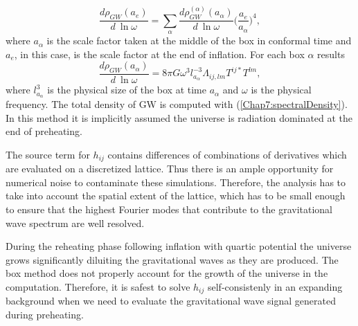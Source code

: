 \documentclass[11pt,a4paper,twoside]{book}
\begin{document}
\begin{equation}
\label{Chap7:SumUpEnergyDensityBoxMethod}
\frac{d\rho_{GW}(a_{e})}{d\ \ln \omega} = \sum_{\alpha} \frac{d\rho_{GW}^{(\alpha)}(a_{\alpha})}{d\ \ln \omega} \Bigg(\frac{a_{e}}{a_{\alpha}}\Bigg)^{4},
\end{equation}
where $ a_{\alpha} $ is the scale factor taken at the middle of the box in conformal time and $ a_{e} $, in this case, is the scale factor at the end of inflation. For each box $\alpha$ results
\begin{equation}
\label{BoxMethod_EnergyDensityEmitted}
\frac{d\rho_{GW}(a_{\alpha})}{d\ \ln \omega}=8\pi G \omega^{3}l^{-3}_{a_{\alpha}}\Lambda_{ij,lm}T^{ij*}T^{lm},
\end{equation}
where $ l^{3}_{a_{\alpha}} $ is the physical size of the box at time $ a_{\alpha} $ and $\omega$ is the physical frequency. The total density of GW is computed with (\ref{Chap7:spectralDensity}). In this method it is implicitly assumed the universe is radiation dominated at the end of preheating.

The source term for $ h_{ij} $ contains differences of combinations of derivatives which are evaluated on a discretized lattice. Thus there is an ample opportunity for numerical noise to contaminate these simulations. Therefore, the analysis has to take into account the spatial extent of the lattice, which has to be small enough to ensure that the highest Fourier modes that contribute to the gravitational wave spectrum are well resolved.

During the reheating phase  following inflation with quartic potential the universe grows significantly diluiting the gravitational waves as they are produced. The box method does not properly account for the growth of the universe in the computation. Therefore, it is safest to solve $ h_{ij} $ self-consistenly in an expanding background when we need to evaluate the gravitational wave signal generated during preheating.
\end{document}
